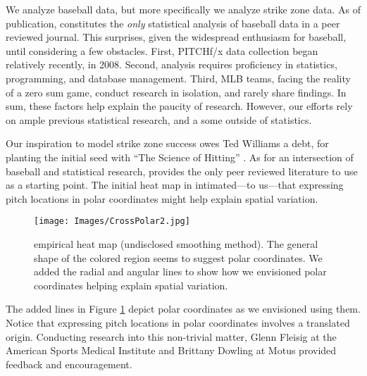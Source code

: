 
We analyze baseball data, but more specifically we analyze strike zone data. As of publication, \cite{Cross2015} constitutes the {\it only} statistical analysis of baseball data in a peer reviewed journal. This surprises, given the widespread enthusiasm for baseball, until considering a few obstacles. First, PITCHf/x\textsuperscript{\textregistered} data collection began relatively recently, in 2008. Second, analysis requires proficiency in statistics, programming, and database management. Third, MLB teams, facing the reality of a zero sum game, conduct research in isolation, and rarely share findings. In sum, these factors help explain the paucity of research. However, our efforts rely on ample previous statistical research, and a some outside of statistics.

Our inspiration to model strike zone success owes Ted Williams a debt, for planting the initial seed with ``The Science of Hitting'' \citep{Williams1971}. As for an intersection of baseball and statistical research, \cite{Cross2015} provides the only peer reviewed literature to use as a starting point. The initial heat map in \cite{Cross2015} intimated---to us---that expressing pitch locations in polar coordinates might help explain spatial variation. 
        \begin{figure}[H]
      	\centering
      	\texttt{[image: Images/CrossPolar2.jpg]} 
      	\caption{\cite{Cross2015} empirical heat map (undisclosed smoothing method). The general shape of the colored region seems to suggest polar coordinates. We added the radial and angular lines to show how we envisioned polar coordinates helping explain spatial variation.}
      	\label{fig:cross}
      	\end{figure}
The added lines in Figure \ref{fig:cross} depict polar coordinates as we envisioned using them. Notice that expressing pitch locations in polar coordinates involves a translated origin. Conducting research into this non-trivial matter, Glenn Fleisig at the American Sports Medical Institute \citep{Fleisig2002} and Brittany Dowling at Motus \citep{Dowling2016} provided feedback and encouragement. 

